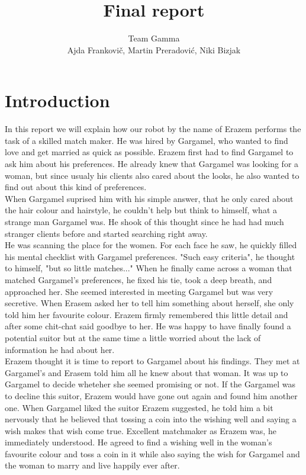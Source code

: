 \documentclass[12pt,a4paper]{article}
\author{Team Gamma \\ {\small Ajda Frankovič, Martin Preradović, Niki Bizjak}}
\title{Final report}
\date{}
\begin{document}
	
	\maketitle

	\tableofcontents
	
	\section{Introduction}
	In this report we will explain how our robot by the name of Erazem performs the task of a skilled match maker. He was hired by Gargamel, who wanted to find love and get married as quick as possible. Erazem first had to find Gargamel to ask him about his preferences. He already knew that Gargamel was looking for a woman, but since usualy his clients also cared about the looks, he also wanted to find out about this kind of preferences. \\
	
	When Gargamel suprised him with his simple answer, that he only cared about the hair colour and hairstyle, he couldn't help but think to himself, what a strange man Gargamel was. He shook of this thought since he had had much stranger clients before and started searching right away. \\

	He was scanning the place for the women. For each face he saw, he quickly filled his mental checklist with Gargamel preferences. "Such easy criteria", he thought to himself, "but so little matches..." When he finally came across a woman that matched Gargamel's preferences, he fixed his tie, took a deep breath, and approached her. She seemed interested in meeting Gargamel but was very secretive. When Erasem asked her to tell him something about herself, she only told him her favourite colour. Erazem firmly remembered this little detail and after some chit-chat said goodbye to her. He was happy to have finally found a potential suitor but at the same time a little worried about the lack of information he had about her. \\
	
	Erazem thought it is time to report to Gargamel about his findings. They met at Gargamel's and Erasem told him all he knew about that woman. It was up to Gargamel to decide wheteher she seemed promising or not. If the Gargamel was to decline this suitor, Erazem would have gone out again and found him another one. When Gargamel liked the suitor Erazem suggested, he told him a bit nervously that he believed that tossing a coin into the wishing well and saying a wish makes that wish come true. Excellent matchmaker as Erazem was, he immediately understood. He agreed to find a wishing well in the woman's favourite colour and toss a coin in it while also saying the wish for Gargamel and the woman to marry and live happily ever after. \\
\end{document}
